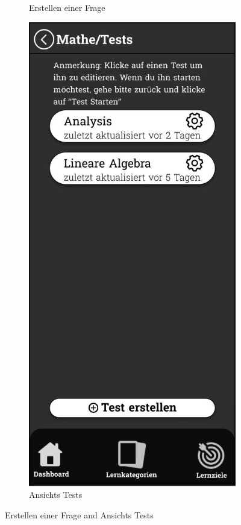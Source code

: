 \begin{figure}[htbp]
\begin{subfigure}[b]{0.45\linewidth}
          \caption{Erstellen einer Frage}
          \label{fig:frage-erstellen}
        \end{subfigure}
        \hfill
        \begin{subfigure}[b]{0.45\linewidth}
          \centering
          \includegraphics[width=\linewidth]{images/Mockups/Tests.JPG}
          \caption{Ansichts Tests}
          \label{fig:tests-ansicht}
        \end{subfigure}
        \caption{Erstellen einer Frage and Ansichts Tests}
        \label{fig:frage-tests}
      \end{figure}


